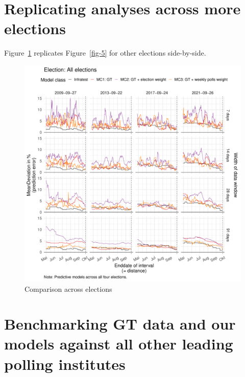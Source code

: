 \documentclass[
  letterpaper,
  DIV=11,
  numbers=noendperiod]{scrartcl}
\begin{document}
\hypertarget{replicating-analyses-across-more-elections}{%
\section{Replicating analyses across more
elections}\label{replicating-analyses-across-more-elections}}

Figure~\ref{fig-A9} replicates Figure~\ref{fig-5} for other elections
side-by-side.

\begin{figure}[H]

\caption{\label{fig-A9}Comparison across elections}

{\centering \includegraphics{figures/fig-A9-1.pdf}

}

\end{figure}

\hypertarget{benchmarking-gt-data-and-our-models-against-all-other-leading-polling-institutes}{%
\section{Benchmarking GT data and our models against all other leading
polling
institutes}\label{benchmarking-gt-data-and-our-models-against-all-other-leading-polling-institutes}}
\end{document}
